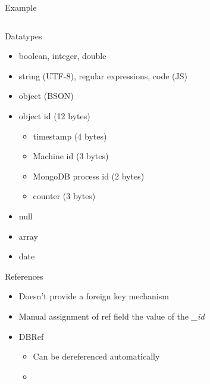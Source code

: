 \documentclass[sans]{beamer}
\begin{document}
\begin{frame}{Example}
	\inputminted{js}{codes/docEx.js}
\end{frame}

\begin{frame}{Datatypes}
	\begin{itemize}
		\item boolean, integer, double
		\item string (UTF-8), regular expressions, code (JS)
		\item object (BSON)
		\item object id (12 bytes)
			\begin{itemize}
				\item timestamp (4 bytes)
				\item Machine id (3 bytes)
				\item MongoDB process id (2 bytes)
				\item counter (3 bytes)
			\end{itemize}
		\item null
		\item array
		\item date
	\end{itemize}
\end{frame}

\begin{frame}{References}
	\begin{itemize}
		\item Doesn't provide a foreign key mechanism
		\item Manual assignment of ref field the value of the {\it \_id}
		\item DBRef
		\begin{itemize}
			\item Can be dereferenced automatically
			\item \inputminted[fontsize=\footnotesize]{js}{codes/dbref.js}
		\end{itemize}

	\end{itemize}
\end{frame}
\end{document}
